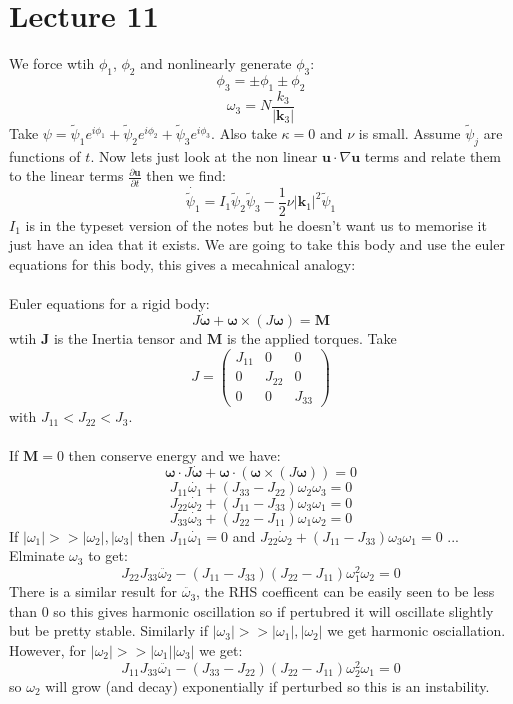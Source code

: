 \documentclass{article}
\begin{document}
\section{Lecture 11}
We force wtih $\phi_1$, $\phi_2$ and nonlinearly generate $\phi_3$:
$$
\phi_3 = \pm \phi_1 \pm \phi_2
$$
$$
\omega_3 = N \frac{k_3}{|\bm k_3|}
$$
Take $\psi = \tilde \psi_1 e^{i\phi_1} + \tilde \psi_2 e^{i \phi_2} + \tilde \psi_3 e^{i \phi_3}$. Also take $\kappa = 0$ and $\nu$ is small. Assume $\tilde \psi_j$ are functions of $t$. Now lets just look at the non linear $\bm u \cdot \nabla \bm u$ terms and relate them to the linear terms $\frac{\partial \bm u}{\partial t}$ then we find:
$$
\dot{\tilde \psi_1} = I_1 \tilde \psi_2 \tilde \psi_3 - \frac{1}{2} \nu |\bm k_1 |^2 \tilde \psi_1
$$
$I_1$ is in the typeset version of the notes but he doesn't want us to memorise it just have an idea that it exists. We are going to take this body and use the euler equations for this body, this gives a mecahnical analogy:\\\\
Euler equations for a rigid body:
$$
J \dot{ \bm \omega} + \bm \omega \times ( J \bm \omega) = \bm M
$$
wtih $\bm J$ is the Inertia tensor and $\bm M$ is the applied torques. Take 
$$
J = \begin{pmatrix} J_{11} & 0 & 0\\ 0& J_{22} & 0 \\ 0 & 0 & J_{33} \end{pmatrix}
$$
with $J_{11} < J_{22} < J_{3}$.\\\\
If $\bm M = 0$ then conserve energy and we have:
$$
 \bm \omega \cdot J \dot{\bm \omega} + \bm \omega \cdot ( \bm \omega \times (J \bm \omega)) = 0
$$
$$
J_{11} \dot{\omega_1} + (J_{33} - J_{22} ) \omega_2 \omega_3 = 0
$$
$$
J_{22} \dot{\omega_2} + (J_{11} - J_{33}) \omega_3 \omega_1 = 0
$$
$$
J_{33} \dot{\omega_3} + (J_{22} - J_{11}) \omega_1 \omega_2 = 0
$$
If $| \omega_1 | >> | \omega_2| , |\omega_3|$ then $J_{11} \dot{\omega_1} = 0$ and $J_{22} \dot \omega_2 + ( J_{11} - J_{33} ) \omega_3 \omega_1 = 0$ ...\\
Elminate $\omega_3$ to get:
$$
J_{22} J_{33} \ddot{\omega_2} - (J_{11} - J_{33} ) (J_{22} - J_{11}) \omega_1^2 \omega_2 = 0
$$
There is a similar result for $\ddot{\omega_3}$, the RHS coefficent can be easily seen to be less than 0 so this gives harmonic oscillation so if pertubred it will oscillate slightly but be pretty stable. Similarly if $|\omega_3| >> |\omega_1|, |\omega_2|$ we get harmonic osciallation. However, for $|\omega_2| >> |\omega_1| |\omega_3|$ we get:
$$
J_{11} J_{33} \ddot{\omega_1} - (J_{33} - J_{22} ) ( J_{22} - J_{11}) \omega_2^2 \omega_1 = 0
$$
so $\omega_2$ will grow (and decay) exponentially if perturbed so this is an instability.
\end{document}
